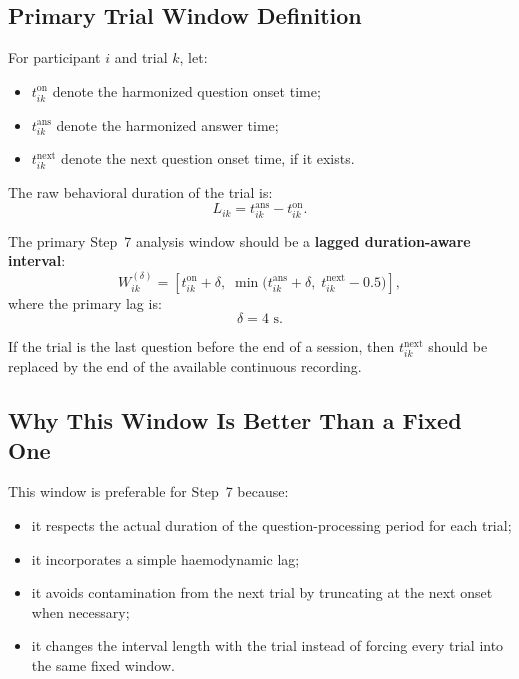 \documentclass[11pt]{article}
\begin{document}
\subsection{Primary Trial Window Definition}
For participant \(i\) and trial \(k\), let:
\begin{itemize}
    \item \(t^{\mathrm{on}}_{ik}\) denote the harmonized question onset time;
    \item \(t^{\mathrm{ans}}_{ik}\) denote the harmonized answer time;
    \item \(t^{\mathrm{next}}_{ik}\) denote the next question onset time, if it exists.
\end{itemize}

The raw behavioral duration of the trial is:
\begin{equation}
L_{ik} = t^{\mathrm{ans}}_{ik} - t^{\mathrm{on}}_{ik}.
\end{equation}

The primary Step~7 analysis window should be a \textbf{lagged duration-aware interval}:
\begin{equation}
W^{(\delta)}_{ik}
=
\left[
t^{\mathrm{on}}_{ik} + \delta,\;
\min\!\bigl(t^{\mathrm{ans}}_{ik} + \delta,\; t^{\mathrm{next}}_{ik} - 0.5\bigr)
\right],
\end{equation}
where the primary lag is:
\begin{equation}
\delta = 4 \text{ s}.
\end{equation}

If the trial is the last question before the end of a session, then \(t^{\mathrm{next}}_{ik}\) should be
replaced by the end of the available continuous recording.

\subsection{Why This Window Is Better Than a Fixed One}
This window is preferable for Step~7 because:
\begin{itemize}
    \item it respects the actual duration of the question-processing period for each trial;
    \item it incorporates a simple haemodynamic lag;
    \item it avoids contamination from the next trial by truncating at the next onset when necessary;
    \item it changes the interval length with the trial instead of forcing every trial into the same fixed window.
\end{itemize}
\end{document}
